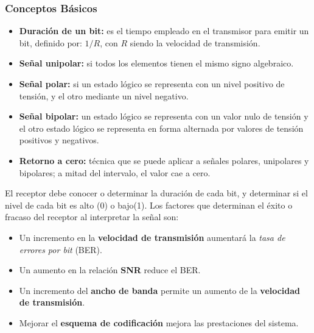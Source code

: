 \documentclass[10pt,a4paper]{article}
\begin{document}
\subsubsection{Conceptos Básicos}
\begin{itemize}
\item \textbf{Duración de un bit:} es el tiempo empleado en el transmisor para emitir un bit, definido por: $1/R$, con $R$ siendo la velocidad de transmisión.
\item \textbf{Señal unipolar:} si todos los elementos tienen el mismo signo algebraico.
\item \textbf{Señal polar:} si un estado lógico se representa con un nivel positivo de tensión, y el otro mediante un nivel negativo.
\item \textbf{Señal bipolar:} un estado lógico se representa con un valor nulo de tensión y el otro estado lógico se representa en forma alternada por valores de tensión positivos y negativos.
\item \textbf{Retorno a cero:} técnica que se puede aplicar a señales polares, unipolares y bipolares; a mitad del intervalo, el valor cae a cero.
\end{itemize}

El receptor debe conocer o determinar la duración de cada bit, y determinar si el nivel de cada bit es alto (0) o bajo(1). Los factores que determinan el éxito o fracaso del receptor al interpretar la señal son:
\begin{itemize}
\item Un incremento en la \textbf{velocidad de transmisión} aumentará la \textit{tasa de errores por bit} (BER).
\item Un aumento en la relación \textbf{SNR} reduce el BER.
\item Un incremento del \textbf{ancho de banda} permite un aumento de la \textbf{velocidad de transmisión}.
\item Mejorar el \textbf{esquema de codificación} mejora las prestaciones del sistema.
\end{itemize}
\end{document}
